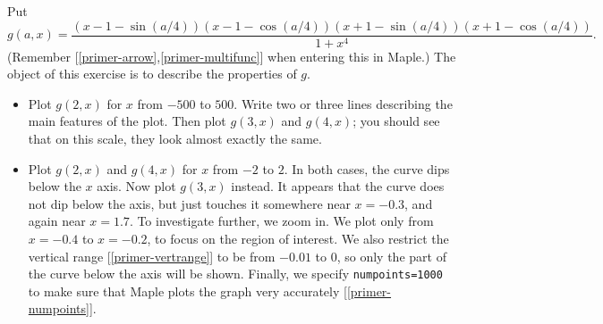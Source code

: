 \documentclass[a4paper,10pt]{amsbook}
\begin{document}
\begin{exercise}\label{ex-quartic}
 Put 
 \[ g(a,x) =
    \frac { (x-1-\sin(a/4))(x-1-\cos(a/4))
            (x+1-\sin(a/4))(x+1-\cos(a/4))}
          {1+{x}^{4}}. 
 \]
 (Remember [\ref{primer-arrow},\ref{primer-multifunc}] when entering
 this in Maple.)  The object of this exercise is to describe
 the properties of $g$.  
 \begin{itemize}
  \item[(a)] Plot $g(2,x)$ for $x$ from $-500$ to $500$.
   Write two or three lines describing the main features of
   the plot.  Then plot $g(3,x)$ and $g(4,x)$; you should see
   that on this scale, they look almost exactly the same.
  \item[(b)] Plot $g(2,x)$ and $g(4,x)$ for $x$ from $-2$ to $2$.  In
   both cases, the curve dips below the $x$ axis.  Now plot $g(3,x)$
   instead.  It appears that the curve does not dip below the axis,
   but just touches it somewhere near $x=-0.3$, and again near
   $x=1.7$.  To investigate further, we zoom in.  We plot only from
   $x=-0.4$ to $x=-0.2$, to focus on the region of interest.  We also
   restrict the vertical range [\ref{primer-vertrange}] to be
   from $-0.01$ to $0$, so only the part of the curve below
   the axis will be shown.  Finally, we specify
   \verb~numpoints=1000~ to make sure that Maple plots the
   graph very accurately [\ref{primer-numpoints}].  


\end{itemize}
\end{exercise}
\end{document}
